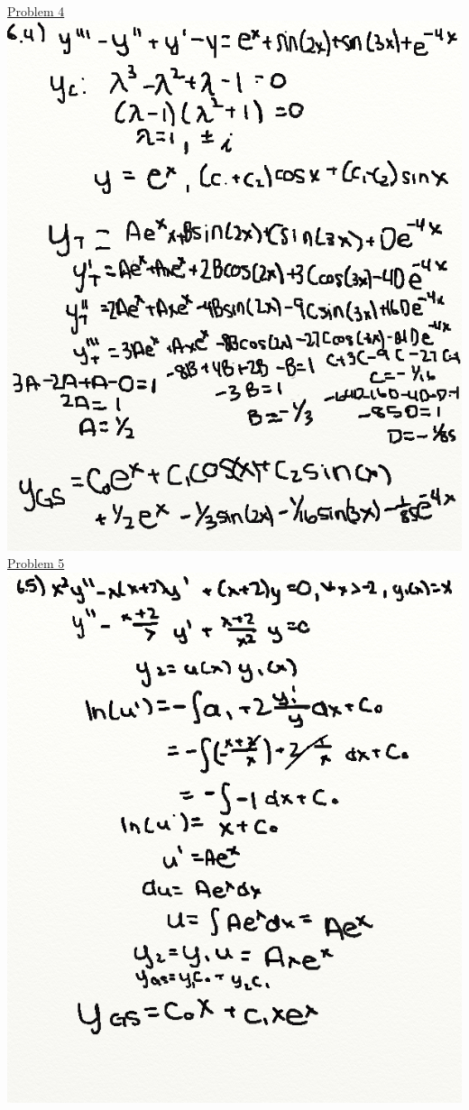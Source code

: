 \documentclass{article}
\begin{document}
\underline{Problem 4}\newline{}
\includegraphics[width=\textwidth,height=\textheight,keepaspectratio]{ams361p4.png}\clearpage{}
\underline{Problem 5}\newline{}
\includegraphics[width=\textwidth,height=\textheight,keepaspectratio]{ams361p5.png}\clearpage{}
\end{document}
